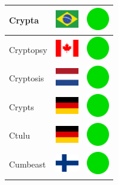 \documentclass[12pt, a4paper, twoside]{report}
\begin{document}
\begin{center}
\begin{longtable}{|p{5cm}|p{2cm}|p{2cm}|}
Crypta & \includegraphics[width=1cm]{4x3/br} & \includegraphics[width=1cm]{likes/y} \\ \hline
Cryptopsy & \includegraphics[width=1cm]{4x3/ca} & \includegraphics[width=1cm]{likes/y} \\ \hline
Cryptosis & \includegraphics[width=1cm]{4x3/nl} & \includegraphics[width=1cm]{likes/y} \\ \hline
Crypts & \includegraphics[width=1cm]{4x3/de} & \includegraphics[width=1cm]{likes/y} \\ \hline
Ctulu & \includegraphics[width=1cm]{4x3/de} & \includegraphics[width=1cm]{likes/y} \\ \hline
Cumbeast & \includegraphics[width=1cm]{4x3/fi} & \includegraphics[width=1cm]{likes/y} \\ \hline

\end{longtable}
\end{center}
\end{document}
